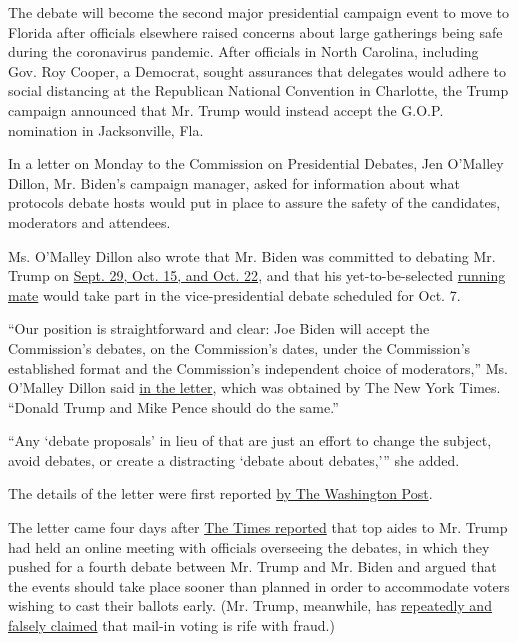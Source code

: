 The debate will become the second major presidential campaign event to
move to Florida after officials elsewhere raised concerns about large
gatherings being safe during the coronavirus pandemic. After officials
in North Carolina, including Gov. Roy Cooper, a Democrat, sought
assurances that delegates would adhere to social distancing at the
Republican National Convention in Charlotte, the Trump campaign
announced that Mr. Trump would instead accept the G.O.P. nomination in
Jacksonville, Fla.

In a letter on Monday to the Commission on Presidential Debates, Jen
O'Malley Dillon, Mr. Biden's campaign manager, asked for information
about what protocols debate hosts would put in place to assure the
safety of the candidates, moderators and attendees.

Ms. O'Malley Dillon also wrote that Mr. Biden was committed to debating
Mr. Trump on
\href{https://www.nytimes3xbfgragh.onion/interactive/2019/us/elections/2020-presidential-election-calendar.html}{Sept.
29, Oct. 15, and Oct. 22}, and that his yet-to-be-selected
\href{https://www.nytimes3xbfgragh.onion/article/biden-vice-president-2020.html}{running
mate} would take part in the vice-presidential debate scheduled for Oct.
7.

``Our position is straightforward and clear: Joe Biden will accept the
Commission's debates, on the Commission's dates, under the Commission's
established format and the Commission's independent choice of
moderators,'' Ms. O'Malley Dillon said
\href{https://int.graylady3jvrrxbe.onion/data/documenthelper/7038-biden-letter-to-debate-commission/94c02d45d35cdd5b9865/optimized/full.pdf\#page=1}{in
the letter}, which was obtained by The New York Times. ``Donald Trump
and Mike Pence should do the same.''

``Any `debate proposals' in lieu of that are just an effort to change
the subject, avoid debates, or create a distracting `debate about
debates,''' she added.

The details of the letter were first reported
\href{https://www.washingtonpost.com/politics/biden-campaign-confirms-he-will-attend-three-debates-with-trump-criticizes-the-president-for-flipping-on-his-debate-stance/2020/06/22/b48be3a0-b49a-11ea-a510-55bf26485c93_story.html}{by
The Washington Post}.

The letter came four days after
\href{https://www.nytimes3xbfgragh.onion/2020/06/18/us/politics/trump-presidential-debates-2020.html}{The
Times reported} that top aides to Mr. Trump had held an online meeting
with officials overseeing the debates, in which they pushed for a fourth
debate between Mr. Trump and Mr. Biden and argued that the events should
take place sooner than planned in order to accommodate voters wishing to
cast their ballots early. (Mr. Trump, meanwhile, has
\href{https://www.nytimes3xbfgragh.onion/2020/06/02/us/politics/republicans-mail-voting-trump.html}{repeatedly
and falsely claimed} that mail-in voting is rife with fraud.)

